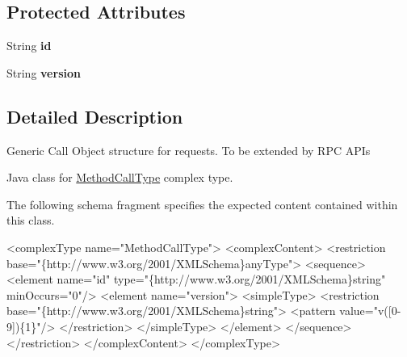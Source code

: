 \subsection*{Protected Attributes}
\begin{DoxyCompactItemize}
\item 
\hypertarget{classcom_1_1telefonica_1_1schemas_1_1unica_1_1rpc_1_1definition_1_1v1_1_1MethodCallType_a479b376eb213dabf0d6968105deedf48}{
String {\bfseries id}}
\label{classcom_1_1telefonica_1_1schemas_1_1unica_1_1rpc_1_1definition_1_1v1_1_1MethodCallType_a479b376eb213dabf0d6968105deedf48}

\item 
\hypertarget{classcom_1_1telefonica_1_1schemas_1_1unica_1_1rpc_1_1definition_1_1v1_1_1MethodCallType_ad7725a8bb566b73048963faa8d4dce27}{
String {\bfseries version}}
\label{classcom_1_1telefonica_1_1schemas_1_1unica_1_1rpc_1_1definition_1_1v1_1_1MethodCallType_ad7725a8bb566b73048963faa8d4dce27}

\end{DoxyCompactItemize}


\subsection{Detailed Description}
Generic Call Object structure for requests. To be extended by RPC APIs

Java class for \hyperlink{classcom_1_1telefonica_1_1schemas_1_1unica_1_1rpc_1_1definition_1_1v1_1_1MethodCallType}{MethodCallType} complex type.

The following schema fragment specifies the expected content contained within this class.


\begin{DoxyPre}
 <complexType name="MethodCallType">
   <complexContent>
     <restriction base="\{http://www.w3.org/2001/XMLSchema\}anyType">
       <sequence>
         <element name="id" type="\{http://www.w3.org/2001/XMLSchema\}string" minOccurs="0"/>
         <element name="version">
           <simpleType>
             <restriction base="\{http://www.w3.org/2001/XMLSchema\}string">
               <pattern value="v([0-9])\{1\}"/>
             </restriction>
           </simpleType>
         </element>
       </sequence>
     </restriction>
   </complexContent>
 </complexType>
 \end{DoxyPre}
 

